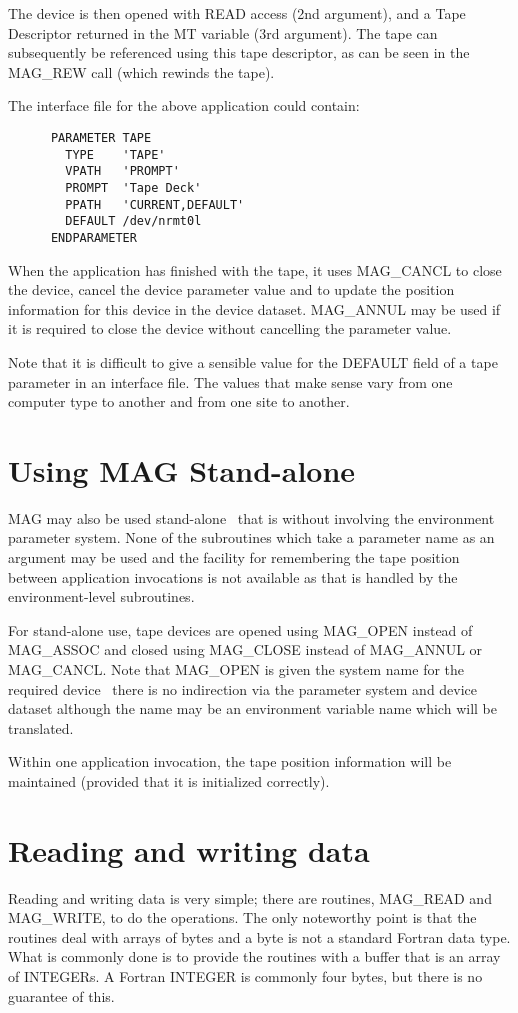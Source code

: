 The device is then opened with READ access (2nd argument), and
a Tape Descriptor returned in the MT variable (3rd argument). The tape
can subsequently be referenced using this tape descriptor, as can be
seen in the MAG\_REW call (which rewinds the tape). 

The interface file for the above application could contain:

\small
\begin{verbatim}
      PARAMETER TAPE
        TYPE    'TAPE'
        VPATH   'PROMPT'      
        PROMPT  'Tape Deck'
        PPATH   'CURRENT,DEFAULT'
        DEFAULT /dev/nrmt0l
      ENDPARAMETER
\end{verbatim}
\normalsize

When the application has finished with the tape, it uses MAG\_CANCL
to close the device, cancel the device parameter value and
to update the position information for this device in the device dataset.
MAG\_ANNUL may be used if it is required to close the device without
cancelling the parameter value.

Note that it is difficult to give a sensible value for the DEFAULT field of a
tape parameter in an interface file. The values that make sense vary from one
computer type to another and from one site to another.

\section{Using MAG Stand-alone}
MAG may also be used stand-alone \dash\ that is without involving the 
environment parameter system. 
None of the subroutines which take a parameter name as an
argument may be used and the facility for remembering the tape position between 
application invocations is not available as that is handled by the 
environment-level subroutines.

For stand-alone use, tape devices are opened using MAG\_OPEN instead
of MAG\_ASSOC and closed using MAG\_CLOSE instead of MAG\_ANNUL or MAG\_CANCL.
Note that MAG\_OPEN is given the system name for the required device
\dash\ there is no indirection via the parameter system and device dataset 
although the name may be an environment variable name which will be translated.

Within one application invocation, the tape position information will be 
maintained (provided that it is initialized correctly).

\section{Reading and writing data}
Reading and writing data is very simple; there are routines, MAG\_READ
and MAG\_WRITE, to do the operations. The only noteworthy point is that the
routines deal with arrays of bytes and a byte is not a standard Fortran data 
type. What is commonly done is to provide the routines with a buffer that is 
an array of INTEGERs. 
A Fortran INTEGER is commonly four bytes, but there is no guarantee
of this. 

